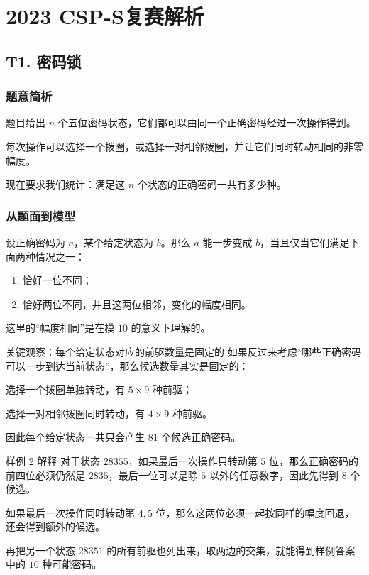 \documentclass{book}
\begin{document}
\chapter{2023 CSP-S复赛解析}
\newpage

    \section{T1. 密码锁} %

    \subsection{题意简析}

    题目给出 $n$ 个五位密码状态，它们都可以由同一个正确密码经过一次操作得到。

    每次操作可以选择一个拨圈，或选择一对相邻拨圈，并让它们同时转动相同的非零幅度。

    现在要求我们统计：满足这 $n$ 个状态的正确密码一共有多少种。

    \subsection{从题面到模型}

    设正确密码为 $a$，某个给定状态为 $b$。那么 $a$ 能一步变成 $b$，当且仅当它们满足下面两种情况之一：

    \begin{enumerate}[leftmargin=2em,itemsep=1pt,topsep=2pt,parsep=0pt,partopsep=0pt]
        \item 恰好一位不同；
        \item 恰好两位不同，并且这两位相邻，变化的幅度相同。
    \end{enumerate}

    这里的“幅度相同”是在模 $10$ 的意义下理解的。

    \begin{keybox}{关键观察：每个给定状态对应的前驱数量是固定的}
        如果反过来考虑“哪些正确密码可以一步到达当前状态”，那么候选数量其实是固定的：

        选择一个拨圈单独转动，有 $5 \times 9$ 种前驱；

        选择一对相邻拨圈同时转动，有 $4 \times 9$ 种前驱。

        因此每个给定状态一共只会产生 $81$ 个候选正确密码。
    \end{keybox}

    \begin{examplebox}{样例 2 解释}
        对于状态 $28355$，如果最后一次操作只转动第 $5$ 位，那么正确密码的前四位必须仍然是 $2835$，最后一位可以是除 $5$ 以外的任意数字，因此先得到 $8$ 个候选。

        如果最后一次操作同时转动第 $4,5$ 位，那么这两位必须一起按同样的幅度回退，还会得到额外的候选。

        再把另一个状态 $28351$ 的所有前驱也列出来，取两边的交集，就能得到样例答案中的 $10$ 种可能密码。
    \end{examplebox}
\end{document}
